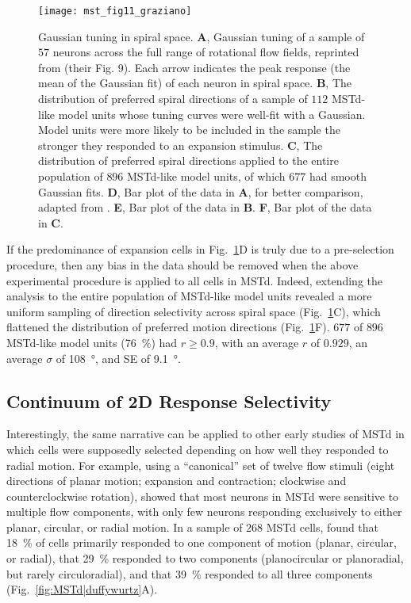 \begin{figure}[t]
  \centering
  \texttt{[image: mst\_fig11\_graziano]}
  \caption{
  Gaussian tuning in spiral space. 
  \textbf{A}, Gaussian tuning of a sample of $57$ neurons across the full 
  range of rotational flow fields, reprinted from \cite{Graziano1994}
  (their Fig. 9). Each arrow indicates the peak response (the mean of the
  Gaussian fit) of each neuron in spiral space. 
  \textbf{B}, The distribution of preferred spiral directions of a sample of 
  $112$ \ac{MSTd}-like model units whose tuning curves were well-fit with a
  Gaussian. Model units were more likely to be included in the sample the
  stronger they responded to an expansion stimulus. 
  \textbf{C}, The distribution of preferred spiral directions applied to 
  the entire population of $896$ MSTd-like model units, of which $677$ had
  smooth Gaussian fits. 
  \textbf{D}, Bar plot of the data in \textbf{A}, for better comparison, 
  adapted from \cite{Clifford1999}. 
  \textbf{E}, Bar plot of the data in \textbf{B}. 
  \textbf{F}, Bar plot of the data in \textbf{C}.}
  \label{fig:MSTd|graziano}
\end{figure}

If the predominance of expansion cells in Fig.~\ref{fig:MSTd|graziano}D is
truly due to a pre-selection procedure, then any bias in the data should be
removed when the above experimental procedure is applied to all cells in 
\ac{MSTd}. Indeed, extending the analysis to the entire population of 
\ac{MSTd}-like model units revealed a more uniform sampling of direction
selectivity across spiral space (Fig.~\ref{fig:MSTd|graziano}C), which 
flattened the distribution of preferred motion directions 
(Fig.~\ref{fig:MSTd|graziano}F). $677$ of $896$ \ac{MSTd}-like model units
(\SI{76}{\percent}) had $r \geq 0.9$, with an average $r$ of $0.929$, an 
average $\sigma$ of \SI{108}{\degree}, and SE of \SI{9.1}{\degree}.


\subsection{Continuum of 2D Response Selectivity}
\label{sec:MSTd|results|continuum2D}
Interestingly, the same narrative can be applied to other early studies of 
\ac{MSTd} in which cells were supposedly selected depending on how well 
they responded to radial motion. For example, using a ``canonical'' set of
twelve flow stimuli (eight directions of planar motion; expansion and
contraction; clockwise and counterclockwise rotation), \cite{DuffyWurtz1995}
showed that most neurons in \ac{MSTd} were sensitive to multiple flow 
components, with only few neurons responding exclusively to either planar,
circular, or radial motion. In a sample of $268$ \ac{MSTd} cells,
\cite{DuffyWurtz1995} found that \SI{18}{\percent} of cells primarily 
responded to one component of motion (planar, circular, or radial), that
\SI{29}{\percent} responded to two components (planocircular or planoradial,
but rarely circuloradial), and that \SI{39}{\percent} responded to all 
three components (Fig.~\ref{fig:MSTd|duffywurtz}A).

